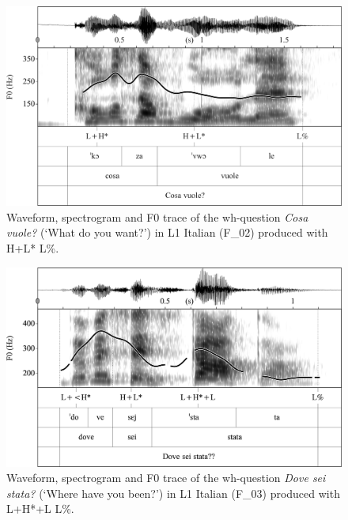 \begin{figure}


\includegraphics[width=\textwidth]{figures/Figure_4.100.png}



\caption{Waveform, spectrogram and F0 trace of the wh-question \textit{Cosa vuole?} (‘What do you want?’) in L1 Italian (F\_02) produced with H+L* L\%.}
\label{fig:4.100}
\end{figure}

\begin{figure}


\includegraphics[width=\textwidth]{figures/Figure_4.101.png}


\caption{Waveform, spectrogram and F0 trace of the wh-question \textit{Dove sei stata?} (‘Where have you been?’) in L1 Italian (F\_03) produced with L+H*+L L\%.}
\label{fig:4.101}
\end{figure}

